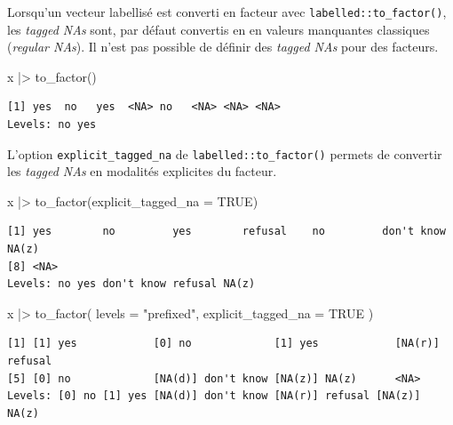\documentclass[
  letterpaper,
  DIV=11,
  numbers=noendperiod,
  oneside]{scrreprt}
\newenvironment{Shaded}{\begin{snugshade}}{\end{snugshade}}
\newcommand{\AttributeTok}[1]{\textcolor[rgb]{0.40,0.45,0.13}{#1}}
\newcommand{\ConstantTok}[1]{\textcolor[rgb]{0.56,0.35,0.01}{#1}}
\newcommand{\FunctionTok}[1]{\textcolor[rgb]{0.28,0.35,0.67}{#1}}
\newcommand{\NormalTok}[1]{\textcolor[rgb]{0.00,0.23,0.31}{#1}}
\newcommand{\SpecialCharTok}[1]{\textcolor[rgb]{0.37,0.37,0.37}{#1}}
\newcommand{\StringTok}[1]{\textcolor[rgb]{0.13,0.47,0.30}{#1}}
\begin{document}
Lorsqu'un vecteur labellisé est converti en facteur avec
\texttt{labelled::to\_factor()}, les \emph{tagged NAs} sont, par défaut
convertis en en valeurs manquantes classiques (\emph{regular NAs}). Il
n'est pas possible de définir des \emph{tagged NAs} pour des facteurs.

\begin{Shaded}
\begin{Highlighting}[]
\NormalTok{x }\SpecialCharTok{|\textgreater{}} \FunctionTok{to\_factor}\NormalTok{()}
\end{Highlighting}
\end{Shaded}

\begin{verbatim}
[1] yes  no   yes  <NA> no   <NA> <NA> <NA>
Levels: no yes
\end{verbatim}

L'option \texttt{explicit\_tagged\_na} de
\texttt{labelled::to\_factor()} permets de convertir les \emph{tagged
NAs} en modalités explicites du facteur.

\begin{Shaded}
\begin{Highlighting}[]
\NormalTok{x }\SpecialCharTok{|\textgreater{}} 
  \FunctionTok{to\_factor}\NormalTok{(}\AttributeTok{explicit\_tagged\_na =} \ConstantTok{TRUE}\NormalTok{)}
\end{Highlighting}
\end{Shaded}

\begin{verbatim}
[1] yes        no         yes        refusal    no         don't know NA(z)     
[8] <NA>      
Levels: no yes don't know refusal NA(z)
\end{verbatim}

\begin{Shaded}
\begin{Highlighting}[]
\NormalTok{x }\SpecialCharTok{|\textgreater{}} 
  \FunctionTok{to\_factor}\NormalTok{(}
    \AttributeTok{levels =} \StringTok{"prefixed"}\NormalTok{, }
    \AttributeTok{explicit\_tagged\_na =} \ConstantTok{TRUE}
\NormalTok{  )}
\end{Highlighting}
\end{Shaded}

\begin{verbatim}
[1] [1] yes            [0] no             [1] yes            [NA(r)] refusal   
[5] [0] no             [NA(d)] don't know [NA(z)] NA(z)      <NA>              
Levels: [0] no [1] yes [NA(d)] don't know [NA(r)] refusal [NA(z)] NA(z)
\end{verbatim}
\end{document}
